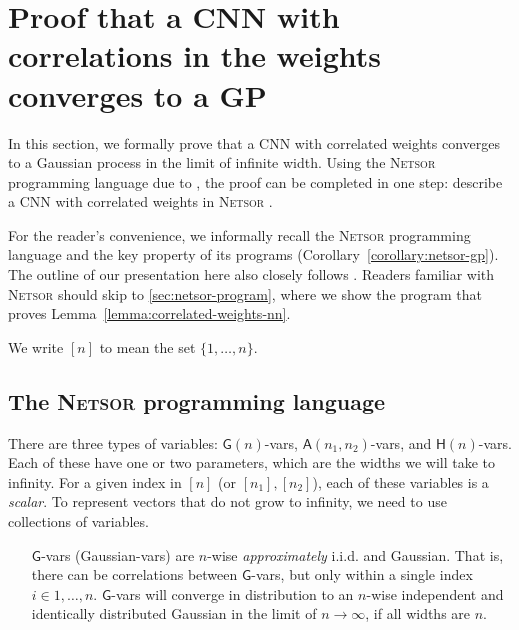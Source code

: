 \appendix
\section{Proof that a CNN with correlations in the weights converges to a GP\label{app:netsor}}
{  %
  \newcommand{\Gva}{\mathsf{G}}
  \newcommand{\Hva}{\mathsf{H}}
  \newcommand{\Ava}{\mathsf{A}}
  \newcommand{\MatMul}{{\texttt{MatMul}}}
  \newcommand{\LinComb}{{\texttt{LinComb }}}
  \newcommand{\Nonlin}{{\texttt{Nonlin }}}
  \newcommand{\Netsor}{{\textsc{Netsor }}}

In this section, we formally prove that a CNN with correlated weights converges
to a Gaussian process in the limit of infinite width. Using the \Netsor
programming language due to \citet{yang2019wide}, the proof can be completed in
one step: describe a CNN with correlated weights in \Netsor.

For the reader's convenience, we informally recall the \Netsor programming language
\citep{yang2019wide} and the key property of its programs (Corollary~\ref{corollary:netsor-gp}). The outline of our presentation here also closely follows
\citet{yang2019wide}. Readers familiar with \Netsor should skip to
\cref{sec:netsor-program}, where we show the program that proves Lemma~\ref{lemma:correlated-weights-nn}.


We write $[n]$ to mean the set $\{1,\dots,n\}$.

\subsection{The \Netsor programming language}
There are three types of variables: $\Gva(n)$-vars, $\Ava(n_1,
n_2)$-vars, and $\Hva(n)$-vars. Each of these have one or two
parameters, which are the widths we will take to infinity. For a
given index in $[n]$ (or $[n_1],[n_2]$), each of these variables is a \emph{scalar}. To
represent vectors that do not grow to infinity, we need to use collections of variables.

\begin{itemize}
\item[$\Gva$-vars] (Gaussian-vars) are $n$-wise \emph{approximately}
i.i.d. and Gaussian. That is, there can be
correlations between $\Gva$-vars, but only within a single index $i \in 1,\dots,n$.
$\Gva$-vars will converge in
distribution to an $n$-wise independent and identically distributed Gaussian in the limit of $n \to \infty$, if
all widths are $n$.


\end{itemize}}
